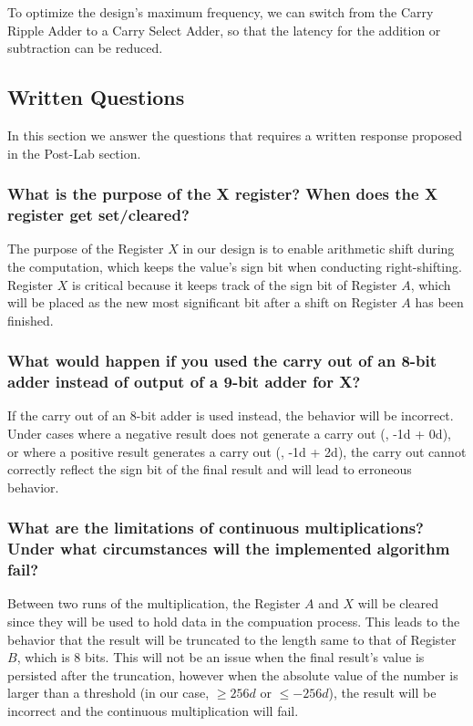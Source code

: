 \documentclass{article}
\begin{document}
To optimize the design's maximum frequency, we can switch from the Carry Ripple Adder to a Carry Select Adder, so that the latency for the addition or subtraction can be reduced.

\subsection{Written Questions}
In this section we answer the questions that requires a written response proposed in the Post-Lab section.

\subsubsection{What is the purpose of the X register? When does the X register get set/cleared?}
The purpose of the Register $X$ in our design is to enable arithmetic shift during the computation, which keeps the value's sign bit when conducting right-shifting. Register $X$ is critical because it keeps track of the sign bit of Register $A$, which will be placed as the new most significant bit after a shift on Register $A$ has been finished.


\subsubsection{What would happen if you used the carry out of an 8-bit adder instead of output of a 9-bit adder for X?}
If the carry out of an 8-bit adder is used instead, the behavior will be incorrect. Under cases where a negative result does not generate a carry out (\eg, -1d + 0d), or where a positive result generates a carry out (\eg, -1d + 2d), the carry out cannot correctly reflect the sign bit of the final result and will lead to erroneous behavior.


\subsubsection{What are the limitations of continuous multiplications? Under what circumstances will the implemented algorithm fail?}
Between two runs of the multiplication, the Register $A$ and $X$ will be cleared since they will be used to hold data in the compuation process. This leads to the behavior that the result will be truncated to the length same to that of Register $B$, which is 8 bits. This will not be an issue when the final result's value is persisted after the truncation, however when the absolute value of the number is larger than a threshold (in our case, $\geq 256d$ or $\leq -256d$), the result will be incorrect and the continuous multiplication will fail.
\end{document}
